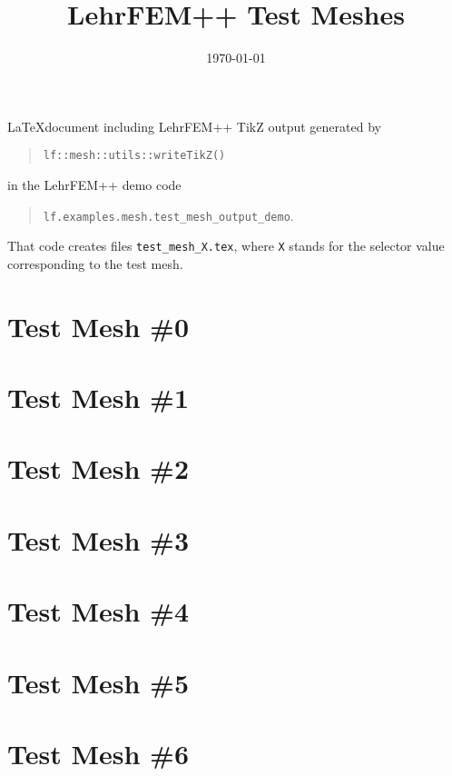 \documentclass[a4wide]{article}
\title{LehrFEM++ Test Meshes}
\date{\today}
\begin{document}
\maketitle

\noindent
\LaTeX document including LehrFEM++ TikZ output generated by
\begin{quote}
  \texttt{lf::mesh::utils::writeTikZ()}
\end{quote}
in the LehrFEM++ demo code
\begin{quote}
  \texttt{lf.examples.mesh.test\_mesh\_output\_demo}.
\end{quote}
That code creates
files \texttt{test\_mesh\_X.tex}, where \texttt{X} stands for the
selector value corresponding to the test mesh.

\section{Test Mesh \#0}

 

\section{Test Mesh \#1}

 

\section{Test Mesh \#2}

 

\section{Test Mesh \#3}

 

\section{Test Mesh \#4}

 

\section{Test Mesh \#5}

 

\section{Test Mesh \#6}

 
\end{document}
